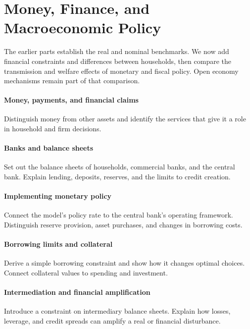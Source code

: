 \clearpage
\part{Money, Finance, and Macroeconomic Policy}\label{part:policy}

The earlier parts establish the real and nominal benchmarks. We now add
financial constraints and differences between households, then compare the
transmission and welfare effects of monetary and fiscal policy. Open economy
mechanisms remain part of that comparison.

\clearpage
{}\label{sec:money-banking}

\subsection{Money, payments, and financial claims}
Distinguish money from other assets and identify the services that give it a
role in household and firm decisions.

\subsection{Banks and balance sheets}
Set out the balance sheets of households, commercial banks, and the central
bank. Explain lending, deposits, reserves, and the limits to credit creation.

\subsection{Implementing monetary policy}
Connect the model's policy rate to the central bank's operating framework.
Distinguish reserve provision, asset purchases, and changes in borrowing costs.

\label{sec:financial-frictions}

\subsection{Borrowing limits and collateral}
Derive a simple borrowing constraint and show how it changes optimal choices.
Connect collateral values to spending and investment.

\subsection{Intermediation and financial amplification}
Introduce a constraint on intermediary balance sheets. Explain how losses,
leverage, and credit spreads can amplify a real or financial disturbance.

